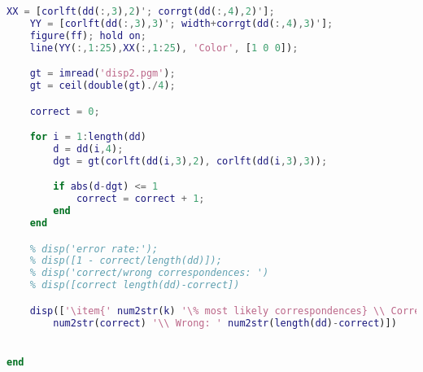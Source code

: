 \documentclass{article}
\begin{document}
\begin{lstlisting}[language=Matlab]
    XX = [corlft(dd(:,3),2)'; corrgt(dd(:,4),2)'];
    YY = [corlft(dd(:,3),3)'; width+corrgt(dd(:,4),3)'];
    figure(ff); hold on;
    line(YY(:,1:25),XX(:,1:25), 'Color', [1 0 0]);

    gt = imread('disp2.pgm');
    gt = ceil(double(gt)./4);

    correct = 0;

    for i = 1:length(dd)
        d = dd(i,4);
        dgt = gt(corlft(dd(i,3),2), corlft(dd(i,3),3));

        if abs(d-dgt) <= 1
            correct = correct + 1;
        end
    end

    % disp('error rate:');
    % disp([1 - correct/length(dd)]);
    % disp('correct/wrong correspondences: ')
    % disp([correct length(dd)-correct])

    disp(['\item{' num2str(k) '\% most likely correspondences} \\ Correct: ' ...
        num2str(correct) '\\ Wrong: ' num2str(length(dd)-correct)])


end



\end{lstlisting}
\end{document}
